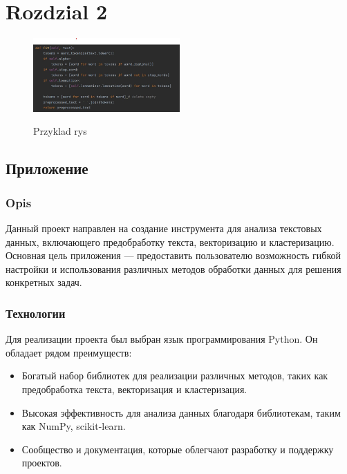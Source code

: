 \chapter{Rozdzial 2}
	
	
	\begin{figure}
		\centering
		\scalebox{0.25} {\includegraphics[width=0.5\textwidth]{./img/rys1.jpg	}}
		\caption{Przyklad rys}
		\label{fig:rys1}
	\end{figure}
		

\section{Приложение}

	\subsection{Opis}
		Данный проект направлен на создание инструмента для анализа текстовых данных, включающего предобработку текста, векторизацию и кластеризацию. Основная цель приложения — предоставить пользователю возможность гибкой настройки и использования различных методов обработки данных для решения конкретных задач.
		
	\subsection{Технологии}
		Для реализации проекта был выбран язык программирования Python. Он обладает рядом преимуществ: \cite{Python}
		\begin{itemize}
			\item Богатый набор библиотек для реализации различных методов, таких как предобработка текста, векторизация и кластеризация.
			\item Высокая эффективность для анализа данных благодаря библиотекам, таким как NumPy, scikit-learn.
			\item Сообщество и документация, которые облегчают разработку и поддержку проектов.
		\end{itemize}
		
		
